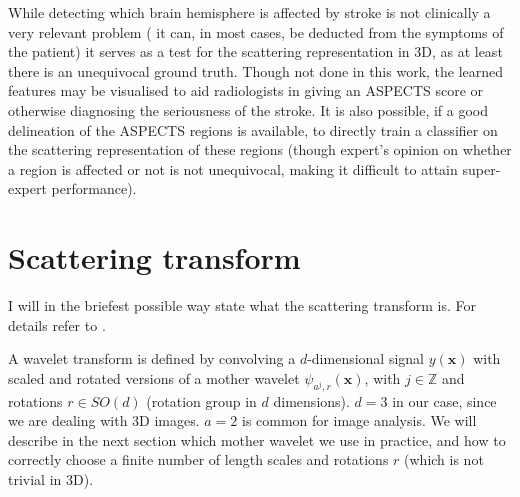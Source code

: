 \documentclass[twocolumn, openany, oneside, article]{memoir}
\begin{document}
While detecting which brain hemisphere is affected by stroke is not clinically a very relevant problem (
it can, in most cases, be deducted from the symptoms of the patient) it serves as a test for the scattering representation in 3D, as at
least there is an unequivocal ground truth. Though not done in this work, the learned features may be visualised to aid
radiologists in giving an ASPECTS score or otherwise diagnosing the seriousness of the stroke. It is also possible, if a
good delineation of the ASPECTS regions is available, to directly train a classifier on the scattering representation of
these regions (though expert's opinion on whether a region is affected or not is not unequivocal, making it difficult to
attain super-expert performance).

\chapter{Scattering transform}
I will in the briefest possible way state what the scattering transform is. For details
refer to \cite{anden2014deep, bruna2013invariant}.

A wavelet transform is defined by convolving a $d$-dimensional signal $y(\bm{x})$ with scaled and rotated versions of a
mother wavelet $\psi_{a^j, r}(\bm{x})$, with $j \in \mathbb{Z}$ and rotations $r \in SO(d)$ (rotation group in $d$
dimensions). $d = 3$ in our case, since we are dealing with 3D images. $a = 2$ is common for image analysis. We will
describe in the next section which mother wavelet we use in practice, and how to correctly choose a finite number of
length scales and rotations $r$ (which is not trivial in 3D).
\end{document}
